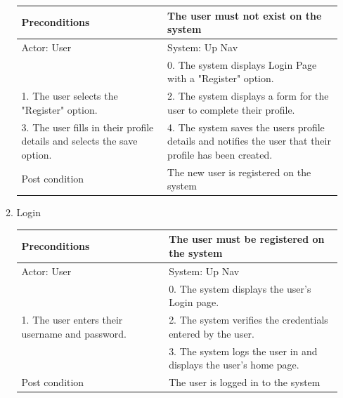 \documentclass{article}
\begin{document}
\begin{center}
\begin{enumerate}
\begin{enumerate}
	\begin{table}[]
	\centering
		\begin{tabular}{ | m{15em} | m{15em}| }
		\hline
		Preconditions                                                       				& The user must not exist on the system \\ 				
		\hline
		Actor: User                                                       					& System: Up Nav \\ 			
		\hline
                                                                  							& 0. The system displays Login Page with a "Register" option. \\                                                           
		 \hline
		1. The user selects the "Register" option.					& 2.  The system displays a form for the user to complete their profile. \\				
		\hline
		3. The user fills in their profile details and selects the save option. 		& 4. The system saves the users profile details and notifies the user that their profile has been created. \\ 
		\hline
		Post condition                                                     				& The new user is registered on the system \\ 				
		\hline
		\end{tabular}
	\end{table}

	\item{Login}

	\begin{table}[]
	\centering
		\begin{tabular}{ | m{15em} | m{15em}| }
		\hline
		Preconditions                                    												& The user must be registered on the system \\ 
		\hline
		Actor: User                                     												& System: Up Nav \\ 
		\hline
                                               		 													& 0. The system displays the user's Login page. \\ 
		\hline
		1. The user enters their username and password. 										& 2. The system verifies the credentials entered by the user. \\
		\hline
                                                															& 3. The system logs the user in and displays the user's home page. \\
		\hline
		Post condition                                  												& The user is logged in to the system \\ 
		\hline
		\end{tabular}
	\end{table}


\end{enumerate}
\end{enumerate}
\end{center}
\end{document}

